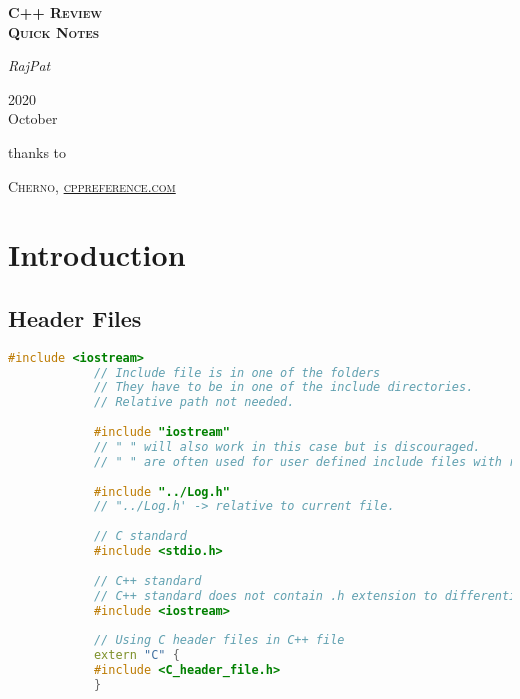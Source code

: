 \documentclass{article}
\begin{document}
\begin{titlepage}
	\centering
	\vspace{1cm}
	{\scshape\LARGE\textbf{C++ Review \\ Quick Notes} \par}
	\vspace{2cm}
	{\LARGE\itshape RajPat\par}
	\vspace{1cm}
	{\large 2020\\ October\par}
	\vfill
    thanks to \par
	\textsc{Cherno, \url{cppreference.com}}
\end{titlepage}


\newpage
\tableofcontents

\newpage
\lstlistoflistings

\newpage
\section{Introduction}
    \subsection{Header Files}
        \begin{lstlisting}[language=C++, caption=Header file example]
            #include <iostream> 
            // Include file is in one of the folders 
            // They have to be in one of the include directories. 
            // Relative path not needed.
            
            #include "iostream" 
            // " " will also work in this case but is discouraged. 
            // " " are often used for user defined include files with relative paths.
            
            #include "../Log.h"
            // "../Log.h' -> relative to current file.
            
            // C standard 
            #include <stdio.h>
            
            // C++ standard
            // C++ standard does not contain .h extension to differentiate with C standard library.
            #include <iostream>
            
            // Using C header files in C++ file
            extern "C" {
            #include <C_header_file.h>
            }
        \end{lstlisting}
    
\end{document}
